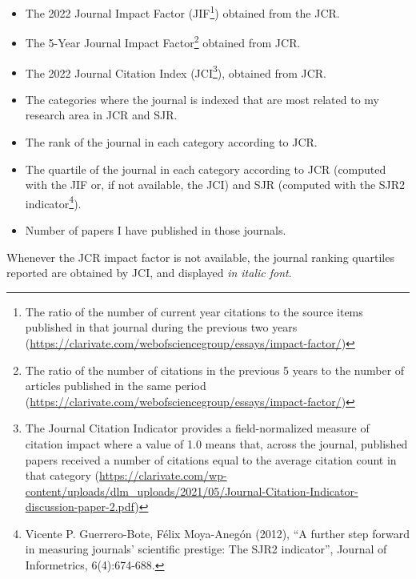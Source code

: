 \begin{itemize}
\item
  The 2022 Journal Impact Factor (JIF\footnote{The ratio of the number
    of current year citations to the source items published in that
    journal during the previous two years
    (\url{https://clarivate.com/webofsciencegroup/essays/impact-factor/})})
  obtained from the JCR.
\item
  The 5-Year Journal Impact Factor\footnote{The ratio of the number of
    citations in the previous 5 years to the number of articles
    published in the same period
    (\url{https://clarivate.com/webofsciencegroup/essays/impact-factor/})}
  obtained from JCR.
\item
  The 2022 Journal Citation Index (JCI\footnote{The Journal Citation
    Indicator provides a field-normalized measure of citation impact
    where a value of 1.0 means that, across the journal, published
    papers received a number of citations equal to the average citation
    count in that category
    (\url{https://clarivate.com/wp-content/uploads/dlm_uploads/2021/05/Journal-Citation-Indicator-discussion-paper-2.pdf})}),
  obtained from JCR.
\item
  The categories where the journal is indexed that are most related to
  my research area in JCR and SJR.
\item
  The rank of the journal in each category according to JCR.
\item
  The quartile of the journal in each category according to JCR
  (computed with the JIF or, if not available, the JCI) and SJR
  (computed with the SJR2 indicator\footnote{Vicente P. Guerrero-Bote,
    Félix Moya-Anegón (2012), ``A further step forward in measuring
    journals' scientific prestige: The SJR2 indicator'', Journal of
    Informetrics, 6(4):674-688.}).
\item
  Number of papers I have published in those journals.
\end{itemize}

Whenever the JCR impact factor is not available, the journal ranking
quartiles reported are obtained by JCI, and displayed \emph{in italic
font}.

